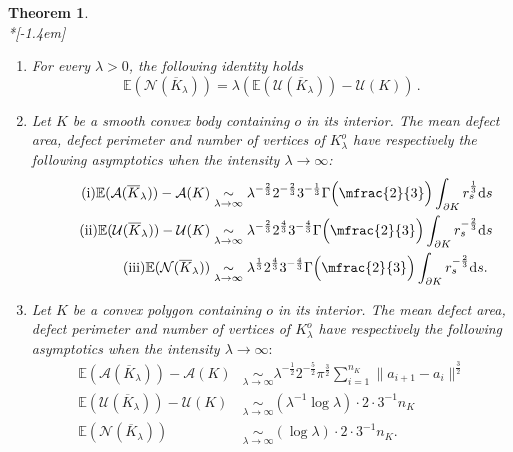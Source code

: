 \documentclass[10pt]{amsart}
\newtheorem{theo}{Theorem}[section]
\theoremstyle{definition}\newtheorem{defi}[theo]{Definition}\newtheorem{rema}[theo]{Remark}\newtheorem{exam}[theo]{Example}\newtheorem{exem}[theo]{Example}\newtheorem{nota}[theo]{Notation}
\newcommand{\cA}{\mathcal{A}}
\newcommand{\cN}{\mathcal{N}}
\newcommand{\cU}{\mathcal{U}}
\newcommand{\dd}{\mathrm{d}}
\newcommand{\E}{\mathbb{E}}
\newcommand*{\alphenumi}{\renewcommand*{\theenumi}{\alph{enumi}}}
\begin{document}
\goodbreak
\begin{theo}\label{theo:crofton}\ \\*[-1.4em]
\begin{enumerate}\alphenumi
\item \label{theo7.1.a}For every $\lambda>0$, the following identity holds
\begin{equation*}
\E(\cN(\overline{K}_\lambda))=\lambda(\E(\cU(\overline{K}_\lambda))-\cU(K))\,.
\end{equation*}
\pagebreak
\item\label{theo7.1.b} Let $K$ be a smooth convex body containing $o$ in its interior. The mean defect area, defect perimeter and number of vertices of $K_{\lambda}^o$ have respectively the following asymptotics when the intensity $\lambda\to\infty$:
\begin{align}
\tag{$\rm i$}\label{theo7.1.b.1} \E(\cA(\overline{K}_{\lambda}))-\cA(K) &\underset{\lambda\to\infty}{\sim} \lambda^{-\frac{2}{3}}2^{-\frac{2}{3}}3^{-\frac1{3}}\Gamma\Big(\mfrac{2}{3}\Big)
 \int_{\partial K}r_s^{\frac1{3}} \dd s\\
\tag{$\rm ii$}\label{theo7.1.b.2} \E(\cU(\overline{K}_{\lambda}))-\cU(K) &\underset{\lambda\to\infty}{\sim}
\lambda^{-\frac{2}{3}}2^{\frac43}3^{-\frac{4}{3}}\Gamma\Big(\mfrac{2}{3}\Big)
\int_{\partial K} r_s^{-\frac{2}{3}}\dd s \\
\tag{$\rm iii$}\label{theo7.1.b.3} \E(\cN(\overline{K}_\lambda)) &\underset{\lambda\to\infty}{\sim} \lambda^{\frac1{3}}2^{\frac43}3^{-\frac{4}{3}}\Gamma\Big(\mfrac{2}{3}\Big)
\int_{\partial K} r_s^{-\frac{2}{3}}\dd s.
\end{align}

\item\label{theo7.1.c} Let $K$ be a convex polygon containing $o$ in its interior. The mean defect area, defect perimeter and number of vertices of $K_{\lambda}^o$ have respectively the following asymptotics when the intensity $\lambda\to\infty:$
\begin{align}
\tag{$\rm i$}\label{theo7.1.c.1} \E(\cA(\overline{K}_\lambda))-\cA(K) &\underset{\lambda\to\infty}{\sim}\lambda^{-\frac1{2}}\displaystyle 2^{-\frac{5}{2}}\pi^{\frac{3}{2}} \sum_{i=1}^{n_K} \|a_{i+1}-a_i\|^{\frac{3}{2}} \\
\tag{$\rm ii$}\label{theo7.1.c.2} \E(\cU(\overline{K}_{\lambda}))-\cU(K) &\underset{\lambda\to\infty}{\sim} (\lambda^{-1}\log \lambda)\cdot2\cdot 3^{-1}n_K \\
\tag{$\rm iii$}\label{theo7.1.c.3} \E(\cN(\overline{K}_\lambda)) &\underset{\lambda\to\infty}{\sim}(\log\lambda)\cdot2\cdot 3^{-1}n_K.
\end{align}
\end{enumerate}
\end{theo}
\end{document}
